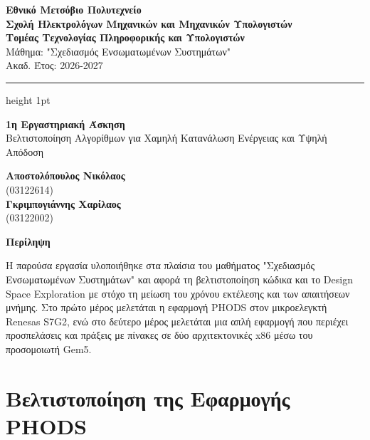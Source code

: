 \documentclass[12pt]{article}
\begin{document}
\noindent
\begin{minipage}[t]{\textwidth}
    {\large \textbf{Εθνικό Μετσόβιο Πολυτεχνείο}} \\
    \textbf{Σχολή Ηλεκτρολόγων Μηχανικών και Μηχανικών Υπολογιστών} \\    
    \textbf{Τομέας Τεχνολογίας Πληροφορικής και Υπολογιστών} \\
    Μάθημα: "Σχεδιασμός Ενσωματωμένων Συστημάτων" \\
    Ακαδ. Έτος: 2026-2027
\end{minipage}

\vspace{0.2cm}
\hrule height 1pt
\vspace{1cm}


\begin{center}
    {\LARGE \textbf{1η Εργαστηριακή Άσκηση}} \\[0.5cm]
    {\large Βελτιστοποίηση Αλγορίθμων για Χαμηλή Κατανάλωση Ενέργειας και Υψηλή Απόδοση}
\end{center}
\vspace{1cm}


\begin{center}
	\textbf{Αποστολόπουλος Νικόλαος} \\
	(03122614) \\
	\textbf{Γκριμπογιάννης Χαρίλαος} \\
	(03122002)
\end{center}
\vspace{1cm}

\begin{center}
    \textbf{\large Περίληψη}
\end{center}

\noindent
Η παρούσα εργασία υλοποιήθηκε στα πλαίσια του μαθήματος "Σχεδιασμός Ενσωματωμένων Συστημάτων" και αφορά τη βελτιστοποίηση κώδικα και το Design Space Exploration με στόχο τη μείωση του χρόνου εκτέλεσης και των απαιτήσεων μνήμης. Στο πρώτο μέρος μελετάται η εφαρμογή PHODS στον μικροελεγκτή Renesas S7G2, ενώ στο δεύτερο μέρος μελετάται μια απλή εφαρμογή που περιέχει προσπελάσεις και πράξεις με πίνακες σε δύο αρχιτεκτονικές x86 μέσω του προσομοιωτή Gem5.
\pagebreak

\tableofcontents
\pagebreak

\section{Βελτιστοποίηση της Εφαρμογής PHODS}
\end{document}
